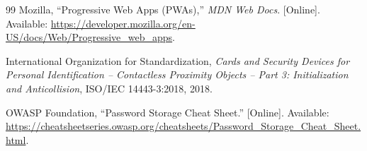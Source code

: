\documentclass[a4paper,oneside,openany]{tietreport}
\begin{document}
\begin{thebibliography}{99}
Mozilla, ``Progressive Web Apps (PWAs),''
\textit{MDN Web Docs}.
[Online]. Available:
\url{https://developer.mozilla.org/en-US/docs/Web/Progressive_web_apps}.

International Organization for Standardization,
\textit{Cards and Security Devices for Personal
Identification -- Contactless Proximity Objects --
Part 3: Initialization and Anticollision},
ISO/IEC 14443-3:2018, 2018.

OWASP Foundation,
``Password Storage Cheat Sheet.''
[Online]. Available:
\url{https://cheatsheetseries.owasp.org/cheatsheets/Password_Storage_Cheat_Sheet.html}.

\end{thebibliography}
\end{document}
